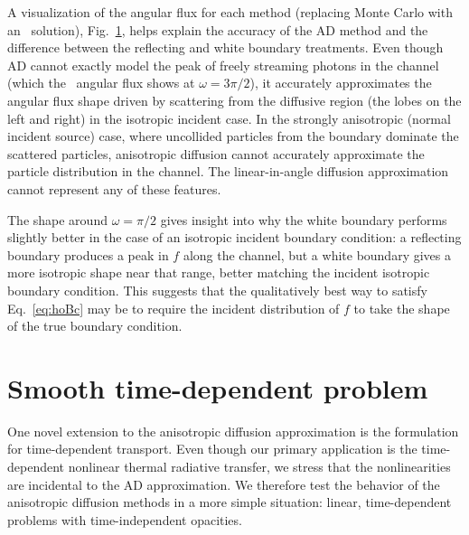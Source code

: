 A visualization of the angular flux for each method (replacing Monte Carlo with
an \SN\ solution), Fig.~\ref{fig:bcChannelIsotropicAngular}, helps explain the
accuracy
of the AD method and the difference between the reflecting and white boundary
treatments. Even though AD cannot exactly model the peak of freely streaming
photons in the channel (which the \SN\ angular flux shows at $\omega=3\pi/2$),
it accurately approximates the angular flux shape driven by scattering from the
diffusive region (the lobes on the left and right) in the isotropic incident
case. In the strongly anisotropic (normal incident source) case, where
uncollided particles from the boundary dominate the scattered particles,
anisotropic diffusion cannot accurately approximate the particle
distribution in the channel.
The linear-in-angle diffusion approximation cannot represent any of these
features.

\begin{figure}[htb]
  \centering\small
  \subfloat[Isotropic]{%
  \vspace{-.25in}%
  }%
  \subfloat[Normal]{%
  \vspace{-.25in}%
  }%
  \label{fig:bcChannelIsotropicAngular}
\end{figure}

The shape around $\omega=\pi/2$ gives insight into why the white boundary
performs slightly better in the case of an isotropic incident boundary
condition: a reflecting boundary produces a peak in $f$
along the channel, but a white boundary gives a more isotropic shape near that
range, better matching the incident isotropic boundary condition. This suggests
that the qualitatively best way to satisfy Eq.~\eqref{eq:hoBc} may be
to require the incident distribution of $f$ to take the shape of the true
boundary condition.

\section{Smooth time-dependent problem}

One novel extension to the anisotropic diffusion approximation is the
formulation for time-dependent transport. Even though our primary application is
the time-dependent nonlinear thermal radiative transfer, we stress that the
nonlinearities are incidental to the AD approximation. We therefore 
test the behavior of the anisotropic diffusion methods in a more simple
situation: linear, time-dependent problems with time-independent opacities.

